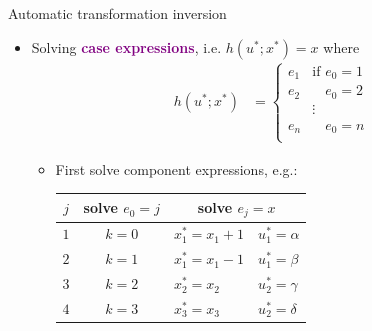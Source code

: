 \documentclass[final]{beamer}
\newlength{\colwidth}
\begin{document}
\begin{frame}[t]
\begin{columns}[t]
\begin{column}{\colwidth}
\begin{block}{Automatic transformation inversion}
\begin{itemize}
          \item Solving \textcolor{purple}{\bfseries case expressions}, i.e. $h(u^*;x^*) = x$ where
                \begin{align*}
                  h(u^*;x^*) & = \begin{cases}
                    e_1 & \text{if }e_0 = 1           \\
                    e_2 & \phantom{\text{if }}e_0 = 2 \\
                        & \vdots                      \\
                    e_n & \phantom{\text{if }}e_0 = n \\
                  \end{cases}
                \end{align*}

                \begin{itemize}
                  \item First solve component expressions, e.g.:

                        \bigskip
                        \begin{center}
                          \setlength\tabcolsep{1em}
                          \begin{tabular}{c|c|ll}
                            $j$ & solve $e_0 = j$ & \multicolumn{2}{c}{solve $e_j = x$}                    \\
                            \hline
                            $1$ & $k = 0$         & $x^*_1 = x_1 + 1$                   & $u^*_1 = \alpha$ \\
                            $2$ & $k = 1$         & $x^*_1 = x_1 - 1$                   & $u^*_1 = \beta $ \\
                            $3$ & $k = 2$         & $x^*_2 = x_2$                       & $u^*_2 = \gamma$ \\
                            $4$ & $k = 3$         & $x^*_3 = x_3$                       & $u^*_2 = \delta$ \\
                          \end{tabular}
                        \end{center}
                        \bigskip


\end{itemize}
\end{itemize}
\end{block}
\end{column}
\end{columns}
\end{frame}
\end{document}
